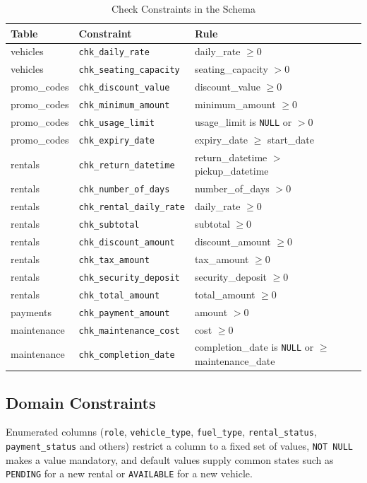 \documentclass[10pt,a4paper]{report}
\newcommand{\col}[1]{\texttt{#1}}
\begin{document}
\begin{table}[htbp]
\centering
\small
\caption{Check Constraints in the Schema}
\label{tab:checks}
\begin{tabular}{@{}lll@{}}
\toprule
\textbf{Table} & \textbf{Constraint} & \textbf{Rule} \\
\midrule
vehicles & \col{chk_daily_rate} & daily\_rate $\geq 0$ \\
vehicles & \col{chk_seating_capacity} & seating\_capacity $> 0$ \\
promo\_codes & \col{chk_discount_value} & discount\_value $\geq 0$ \\
promo\_codes & \col{chk_minimum_amount} & minimum\_amount $\geq 0$ \\
promo\_codes & \col{chk_usage_limit} & usage\_limit is \col{NULL} or $> 0$ \\
promo\_codes & \col{chk_expiry_date} & expiry\_date $\geq$ start\_date \\
rentals & \col{chk_return_datetime} & return\_datetime $>$ pickup\_datetime \\
rentals & \col{chk_number_of_days} & number\_of\_days $> 0$ \\
rentals & \col{chk_rental_daily_rate} & daily\_rate $\geq 0$ \\
rentals & \col{chk_subtotal} & subtotal $\geq 0$ \\
rentals & \col{chk_discount_amount} & discount\_amount $\geq 0$ \\
rentals & \col{chk_tax_amount} & tax\_amount $\geq 0$ \\
rentals & \col{chk_security_deposit} & security\_deposit $\geq 0$ \\
rentals & \col{chk_total_amount} & total\_amount $\geq 0$ \\
payments & \col{chk_payment_amount} & amount $> 0$ \\
maintenance & \col{chk_maintenance_cost} & cost $\geq 0$ \\
maintenance & \col{chk_completion_date} & completion\_date is \col{NULL} or $\geq$ maintenance\_date \\
\bottomrule
\end{tabular}
\end{table}

\subsection{Domain Constraints}
Enumerated columns (\col{role}, \col{vehicle_type}, \col{fuel_type}, \col{rental_status}, \col{payment_status} and others) restrict a column to a fixed set of values, \col{NOT NULL} makes a value mandatory, and default values supply common states such as \col{PENDING} for a new rental or \col{AVAILABLE} for a new vehicle.
\end{document}
